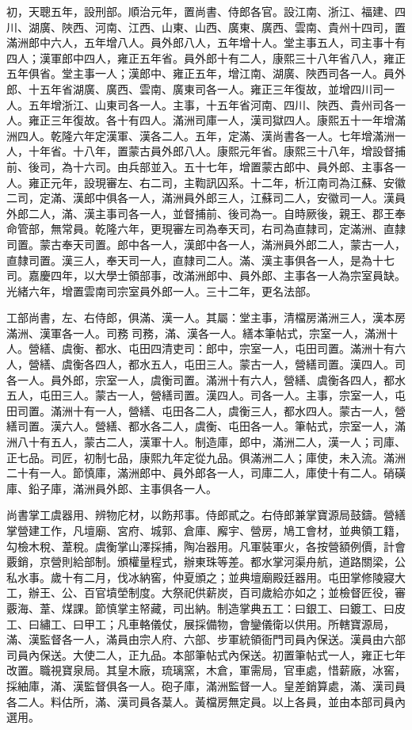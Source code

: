 \begin{pinyinscope}
初，天聰五年，設刑部。順治元年，置尚書、侍郎各官。設江南、浙江、福建、四川、湖廣、陜西、河南、江西、山東、山西、廣東、廣西、雲南、貴州十四司，置滿洲郎中六人，五年增八人。員外郎八人，五年增十人。堂主事五人，司主事十有四人；漢軍郎中四人，雍正五年省。員外郎十有二人，康熙三十八年省八人，雍正五年俱省。堂主事一人；漢郎中、雍正五年，增江南、湖廣、陜西司各一人。員外郎、十五年省湖廣、廣西、雲南、廣東司各一人。雍正三年復故，並增四川司一人。五年增浙江、山東司各一人。主事，十五年省河南、四川、陜西、貴州司各一人。雍正三年復故。各十有四人。滿洲司庫一人，漢司獄四人。康熙五十一年增滿洲四人。乾隆六年定漢軍、漢各二人。五年，定滿、漢尚書各一人。七年增滿洲一人，十年省。十八年，置蒙古員外郎八人。康熙元年省。康熙三十八年，增設督捕前、後司，為十六司。由兵部並入。五十七年，增置蒙古郎中、員外郎、主事各一人。雍正元年，設現審左、右二司，主鞫訊囚系。十二年，析江南司為江蘇、安徽二司，定滿、漢郎中俱各一人，滿洲員外郎三人，江蘇司二人，安徽司一人。漢員外郎二人，滿、漢主事司各一人，並督捕前、後司為一。自時厥後，親王、郡王奉命管部，無常員。乾隆六年，更現審左司為奉天司，右司為直隸司，定滿洲、直隸司置。蒙古奉天司置。郎中各一人，漢郎中各一人，滿洲員外郎二人，蒙古一人，直隸司置。漢三人，奉天司一人，直隸司二人。滿、漢主事俱各一人，是為十七司。嘉慶四年，以大學士領部事，改滿洲郎中、員外郎、主事各一人為宗室員缺。光緒六年，增置雲南司宗室員外郎一人。三十二年，更名法部。

工部尚書，左、右侍郎，俱滿、漢一人。其屬：堂主事，清檔房滿洲三人，漢本房滿洲、漢軍各一人。司務司務，滿、漢各一人。繕本筆帖式，宗室一人，滿洲十人。營繕、虞衡、都水、屯田四清吏司：郎中，宗室一人，屯田司置。滿洲十有六人，營繕、虞衡各四人，都水五人，屯田三人。蒙古一人，營繕司置。漢四人。司各一人。員外郎，宗室一人，虞衡司置。滿洲十有六人，營繕、虞衡各四人，都水五人，屯田三人。蒙古一人，營繕司置。漢四人。司各一人。主事，宗室一人，屯田司置。滿洲十有一人，營繕、屯田各二人，虞衡三人，都水四人。蒙古一人，營繕司置。漢六人。營繕、都水各二人，虞衡、屯田各一人。筆帖式，宗室一人，滿洲八十有五人，蒙古二人，漢軍十人。制造庫，郎中，滿洲二人，漢一人；司庫、正七品。司匠，初制七品，康熙九年定從九品。俱滿洲二人；庫使，未入流。滿洲二十有一人。節慎庫，滿洲郎中、員外郎各一人，司庫二人，庫使十有二人。硝磺庫、鉛子庫，滿洲員外郎、主事俱各一人。

尚書掌工虞器用、辨物庀材，以飭邦事。侍郎貳之。右侍郎兼掌寶源局鼓鑄。營繕掌營建工作，凡壇廟、宮府、城郭、倉庫、廨宇、營房，鳩工會材，並典領工籍，勾檢木稅、葦稅。虞衡掌山澤採捕，陶冶器用。凡軍裝軍火，各按營額例價，計會覈銷，京營則給部制。頒權量程式，辦東珠等差。都水掌河渠舟航，道路關梁，公私水事。歲十有二月，伐冰納窖，仲夏頒之；並典壇廟殿廷器用。屯田掌修陵寢大工，辦王、公、百官墳塋制度。大祭祀供薪炭，百司歲給亦如之；並檢督匠役，審覈海、葦、煤課。節慎掌主帑藏，司出納。制造掌典五工：曰銀工、曰鍍工、曰皮工、曰繡工、曰甲工；凡車輅儀仗，展採備物，會鑾儀衛以供用。所轄寶源局，滿、漢監督各一人，滿員由宗人府、六部、步軍統領衙門司員內保送。漢員由六部司員內保送。大使二人，正九品。本部筆帖式內保送。初置筆帖式一人，雍正七年改置。職視寶泉局。其皇木廠，琉璃窯，木倉，軍需局，官車處，惜薪廠，冰窖，採紬庫，滿、漢監督俱各一人。砲子庫，滿洲監督一人。皇差銷算處，滿、漢司員各二人。料估所，滿、漢司員各葈人。黃檔房無定員。以上各員，並由本部司員內選用。


\end{pinyinscope}
